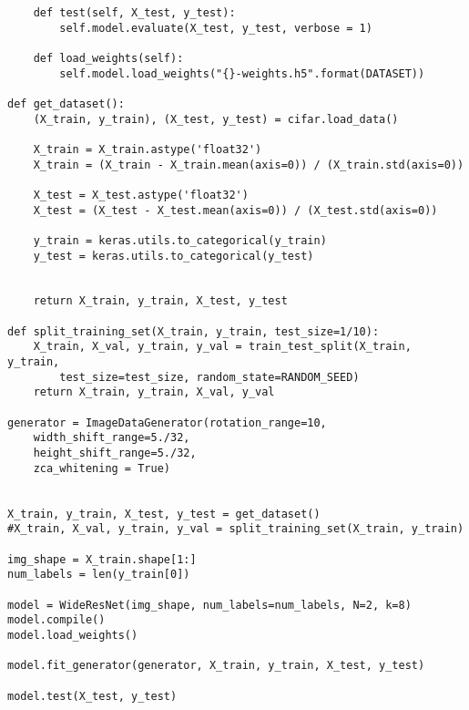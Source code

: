 \documentclass[12pt]{article}
\begin{document}
\begin{adjustwidth}{-50pt}{0pt}
\begin{Verbatim}
	def test(self, X_test, y_test):
		self.model.evaluate(X_test, y_test, verbose = 1)

	def load_weights(self):
		self.model.load_weights("{}-weights.h5".format(DATASET))

def get_dataset():
	(X_train, y_train), (X_test, y_test) = cifar.load_data()
	
	X_train = X_train.astype('float32')
	X_train = (X_train - X_train.mean(axis=0)) / (X_train.std(axis=0))

	X_test = X_test.astype('float32')
	X_test = (X_test - X_test.mean(axis=0)) / (X_test.std(axis=0))
	
	y_train = keras.utils.to_categorical(y_train)
	y_test = keras.utils.to_categorical(y_test)
	
	
	return X_train, y_train, X_test, y_test

def split_training_set(X_train, y_train, test_size=1/10):
	X_train, X_val, y_train, y_val = train_test_split(X_train, y_train,
		test_size=test_size, random_state=RANDOM_SEED)
	return X_train, y_train, X_val, y_val

generator = ImageDataGenerator(rotation_range=10,
	width_shift_range=5./32,
	height_shift_range=5./32,
	zca_whitening = True)


X_train, y_train, X_test, y_test = get_dataset()
#X_train, X_val, y_train, y_val = split_training_set(X_train, y_train)

img_shape = X_train.shape[1:]
num_labels = len(y_train[0])

model = WideResNet(img_shape, num_labels=num_labels, N=2, k=8)
model.compile()
model.load_weights()

model.fit_generator(generator, X_train, y_train, X_test, y_test)

model.test(X_test, y_test)

\end{Verbatim}
\end{adjustwidth}
\end{document}
